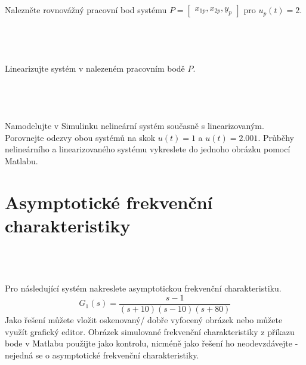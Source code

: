 \documentclass[twoside]{article}
\begin{document}
\subsection{~}
Nalezněte rovnovážný pracovní bod systému $P = \begin{bmatrix} x_{1p}, x_{2p}, y_p \end{bmatrix}$ pro $u_p (t) = 2$.

\subsection{~}
Linearizujte systém v nalezeném pracovním bodě $P$.

\subsection{~}
Namodelujte v Simulinku nelineární systém současně s linearizovaným. Porovnejte odezvy obou systémů
na skok $u(t) = 1$ a $u(t) = 2.001$. Průběhy nelineárního a linearizovaného systému vykreslete do jednoho
obrázku pomocí Matlabu.

\section{Asymptotické frekvenční charakteristiky}
\label{sec:ukol4}

\subsection{~}
Pro následující systém nakreslete asymptotickou frekvenční charakteristiku.
\begin{equation}
	G_1(s) = \frac{s-1}{(s+10)(s-10)(s+80)}
\end{equation}
Jako řešení můžete vložit oskenovaný/ dobře vyfocený obrázek nebo můžete využít grafický editor. Obrázek
simulované frekvenční charakteristiky z příkazu bode v Matlabu použijte jako kontrolu, nicméně jako řešení
ho neodevzdávejte - nejedná se o asymptotické frekvenční charakteristiky.
\end{document}
